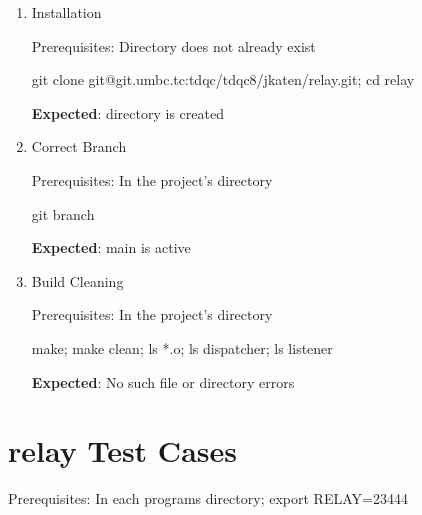 \documentclass{article}
\begin{document}
\begin{enumerate}

    \item Installation

    

    Prerequisites: Directory does not already exist

    {\footnotesize git clone git@git.umbc.tc:tdqc/tdqc8/jkaten/relay.git; cd relay}

    

    \textbf{Expected}: directory is created

    \item Correct Branch

    

    Prerequisites: In the project's directory

    

    {\footnotesize git branch}

    

    \textbf{Expected}: {\footnotesize main} is active

    

    \item Build Cleaning

    

    Prerequisites: In the project's directory

    

    {\footnotesize make; make clean; ls *.o; ls dispatcher; ls listener}

    

    \textbf{Expected}: No such file or directory errors

    

    

\end{enumerate}

\section{{\footnotesize relay} Test Cases}

Prerequisites: In each programs directory; {\footnotesize export RELAY=23444}
\end{document}

